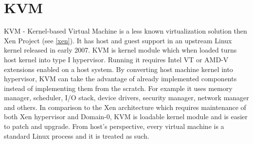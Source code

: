 \section{KVM \cite{kvm}} 
\label{kvm}
KVM - Kernel-based Virtual Machine is a less known virtualization solution then Xen Project (see \ref{xen}). It has host and guest support in an upstream Linux kernel released in early 2007. KVM is kernel module which when loaded turns host kernel into type I hypervisor. Running it requires Intel VT or AMD-V extensions enabled on a host system. By converting host machine kernel into hypervisor, KVM can take the advantage of already implemented components instead of implementing them from the scratch. For example it uses memory manager, scheduler, I/O stack, device drivers, security manager, network manager and others. In comparison to the Xen architecture which requires maintenance of both Xen hypervisor and Domain-0, KVM is loadable kernel module and is easier to patch and upgrade. From host's perspective, every virtual machine is a standard Linux process and it is treated as such.

